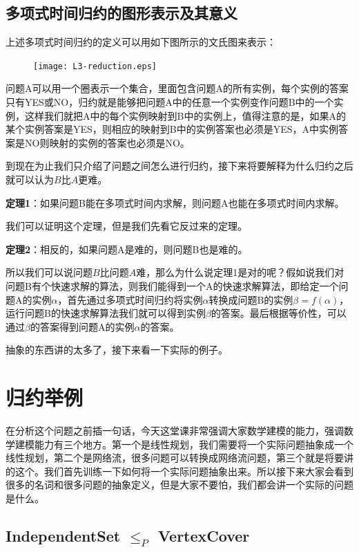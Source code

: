 \subsection{多项式时间归约的图形表示及其意义}

上述多项式时间归约的定义可以用如下图所示的文氏图来表示：

\begin{figure}[H]
    \centering
    \texttt{[image: L3-reduction.eps]}
\end{figure}

问题A可以用一个圈表示一个集合，里面包含问题A的所有实例，每个实例的答案只有YES或NO，归约就是能够把问题A中的任意一个实例变作问题B中的一个实例，这样我们就把A中的每个实例映射到B中的实例上，值得注意的是，如果A的某个实例答案是YES，则相应的映射到B中的实例答案也必须是YES，A中实例答案是NO则映射的实例的答案也必须是NO。

到现在为止我们只介绍了问题之间怎么进行归约，接下来将要解释为什么归约之后就可以认为$B$比$A$更难。

\textbf{定理1}：如果问题B能在多项式时间内求解，则问题A也能在多项式时间内求解。

我们可以证明这个定理，但是我们先看它反过来的定理。

\textbf{定理2}：相反的，如果问题A是难的，则问题B也是难的。

所以我们可以说问题$B$比问题$A$难，那么为什么说定理1是对的呢？假如说我们对问题B有个快速求解的算法，则我们能得到一个A的快速求解算法，即给定一个问题A的实例$\alpha$，首先通过多项式时间归约将实例$\alpha$转换成问题B的实例$\beta=f(\alpha)$，运行问题B的快速求解算法我们就可以得到实例$\beta$的答案。最后根据等价性，可以通过$\beta$的答案得到问题A的实例$\alpha$的答案。

抽象的东西讲的太多了，接下来看一下实际的例子。

\section{归约举例}
在分析这个问题之前插一句话，今天这堂课非常强调大家数学建模的能力，强调数学建模能力有三个地方。第一个是线性规划，我们需要将一个实际问题抽象成一个线性规划，第二个是网络流，很多问题可以转换成网络流问题，第三个就是将要讲的这个。我们首先训练一下如何将一个实际问题抽象出来。所以接下来大家会看到很多的名词和很多问题的抽象定义，但是大家不要怕，我们都会讲一个实际的问题是什么。
\subsection{{\sc IndependentSet} $\le_P$ {\sc VertexCover}}
